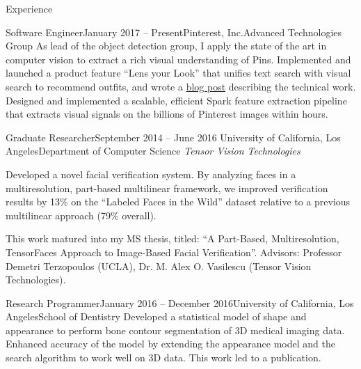 \documentclass{resume}
\begin{document}
\begin{component}{Experience}
    \begin{position}{Software Engineer}{January 2017 -- Present}{Pinterest, Inc.}{Advanced Technologies Group}
    {As lead of the object detection group, I apply the state of the art in computer vision to extract a rich visual understanding of Pins. Implemented and launched a product feature ``Lens your Look'' that unifies text search with visual search to recommend outfits, and wrote a \href{https://medium.com/@Pinterest_Engineering/building-lens-your-look-unifying-text-and-camera-search-1b2f3ef4e393}{blog post} describing the technical work.
      Designed and implemented a scalable, efficient Spark feature extraction pipeline that extracts visual signals on the billions of Pinterest images within hours.}
  \end{position}
  
    \begin{position}{Graduate Researcher}{September 2014 -- June 2016}
        {University of California, Los Angeles}{Department of Computer Science}
    \emph{Tensor Vision Technologies}

    {Developed a novel facial verification system. 
By analyzing faces in a multiresolution, part-based multilinear framework, we improved verification results by 13\% on the ``Labeled Faces in the Wild'' dataset relative to a previous multilinear approach (79\% overall).

This work matured into my MS thesis, titled: ``A Part-Based, Multiresolution, TensorFaces Approach to Image-Based Facial Verification''.
Advisors: Professor Demetri Terzopoulos (UCLA), Dr. M. Alex O. Vasilescu (Tensor Vision Technologies).
}
    \end{position}

    \begin{position}{Research Programmer}{January 2016 -- December 2016}{University of California, Los Angeles}{School of Dentistry}
      {
Developed a statistical model of shape and appearance to perform bone contour segmentation of 3D medical imaging data.
Enhanced accuracy of the model by extending the appearance model and the search algorithm to work well on 3D data.
This work led to a publication.
}
      \end{position}



\end{component}
\end{document}
